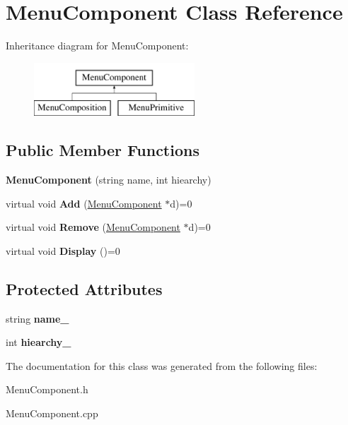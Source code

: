 \hypertarget{classMenuComponent}{\section{Menu\-Component Class Reference}
\label{classMenuComponent}
}
Inheritance diagram for Menu\-Component\-:\begin{figure}[H]
\begin{center}
\leavevmode
\includegraphics[height=2.000000cm]{classMenuComponent}
\end{center}
\end{figure}
\subsection*{Public Member Functions}
\begin{DoxyCompactItemize}
\item 
\hypertarget{classMenuComponent_a89f2473dbe9c3516ed67d6d4de941acd}{{\bfseries Menu\-Component} (string name, int hiearchy)}\label{classMenuComponent_a89f2473dbe9c3516ed67d6d4de941acd}

\item 
\hypertarget{classMenuComponent_aac643f9f5e0e1c146b76af7fa733396f}{virtual void {\bfseries Add} (\hyperlink{classMenuComponent}{Menu\-Component} $\ast$d)=0}\label{classMenuComponent_aac643f9f5e0e1c146b76af7fa733396f}

\item 
\hypertarget{classMenuComponent_abc5764fee211d1ce432fcd59584d2d32}{virtual void {\bfseries Remove} (\hyperlink{classMenuComponent}{Menu\-Component} $\ast$d)=0}\label{classMenuComponent_abc5764fee211d1ce432fcd59584d2d32}

\item 
\hypertarget{classMenuComponent_a65386099aca32e9b81b4eb973e60ece1}{virtual void {\bfseries Display} ()=0}\label{classMenuComponent_a65386099aca32e9b81b4eb973e60ece1}

\end{DoxyCompactItemize}
\subsection*{Protected Attributes}
\begin{DoxyCompactItemize}
\item 
\hypertarget{classMenuComponent_ac21370585d3f6a32f0b6ed8de00245b8}{string {\bfseries name\-\_\-}}\label{classMenuComponent_ac21370585d3f6a32f0b6ed8de00245b8}

\item 
\hypertarget{classMenuComponent_a391646eec6bf36ff63fecce621943b57}{int {\bfseries hiearchy\-\_\-}}\label{classMenuComponent_a391646eec6bf36ff63fecce621943b57}

\end{DoxyCompactItemize}


The documentation for this class was generated from the following files\-:\begin{DoxyCompactItemize}
\item 
Menu\-Component.\-h\item 
Menu\-Component.\-cpp\end{DoxyCompactItemize}
